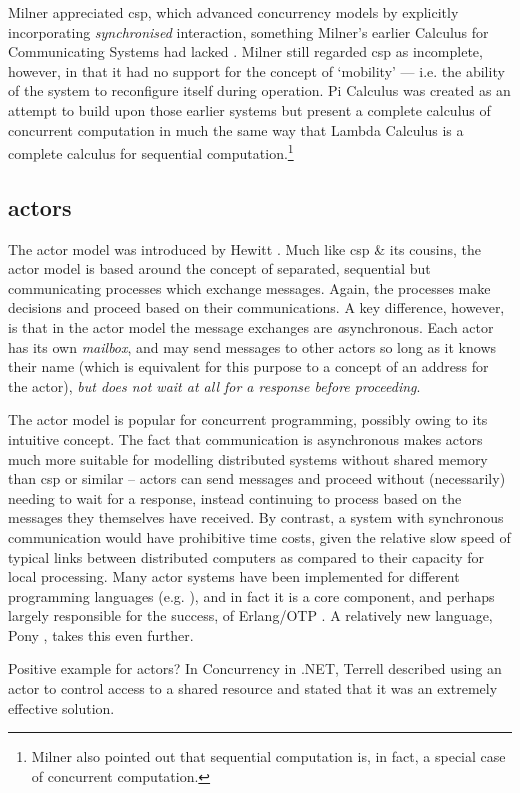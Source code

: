 Milner appreciated \gls{csp}, which advanced concurrency models by explicitly incorporating \emph{synchronised} interaction, something Milner's earlier Calculus for Communicating Systems \cite{Milner1980} had lacked  \cite{Milner1993}.  Milner still regarded \gls{csp} as incomplete, however, in that it had no support for the concept of `mobility' --- i.e. the ability of the system to reconfigure itself during operation.  Pi Calculus was created as an attempt to build upon those earlier systems but present a complete calculus of concurrent computation in much the same way that Lambda Calculus \cite{Barendregt1984} is a complete calculus for sequential computation.\footnote{Milner also pointed out that sequential computation is, in fact, a special case of concurrent computation.}

\subsection{\label{subsec:actors}\texorpdfstring{\Glspl{actor}}{Actors}}
The \gls{actor} \cite{Agha1986} model was introduced by Hewitt \cite{Hewitt1973}.  Much like \gls{csp} \& its cousins, the \gls{actor} model is based around the concept of separated, sequential but communicating processes which exchange messages.  Again, the processes make decisions and proceed based on their communications.  A key difference, however, is that in the \gls{actor} model the message exchanges are \emph{a}synchronous.  Each \gls{actor} has its own \emph{mailbox}, and may send messages to other \glspl{actor} so long as it knows their name (which is equivalent for this purpose to a concept of an address for the \gls{actor}), \emph{but does not wait at all for a response before proceeding}.

The \gls{actor} model is popular for concurrent programming, possibly owing to its intuitive concept.  The fact that communication is asynchronous makes \glspl{actor} much more suitable for modelling distributed systems without shared memory than \gls{csp} or similar -- \glspl{actor} can send messages and proceed without (necessarily) needing to wait for a response, instead continuing to process based on the messages they themselves have received.  By contrast, a system with synchronous communication would have prohibitive time costs, given the relative slow speed of typical links between distributed computers as compared to their capacity for local processing.  Many \gls{actor} systems have been implemented for different programming languages (e.g. \cite{Varela2001,Srinivasan2008,Charousset2016,Bernstein2016} ), and in fact it is a core component, and perhaps largely responsible for the success, of Erlang/OTP \cite{Armstrong2010,Armstrong2013,Vinoski2012}.  A relatively new language, Pony \cite{Clebsch2015,Clebsch2017}, takes this even further.
\begin{anfxnote}{Positive example for actors?}
In Concurrency in .NET, Terrell described using an actor to control access to a shared resource and stated that it was an extremely effective solution.
\end{anfxnote}

